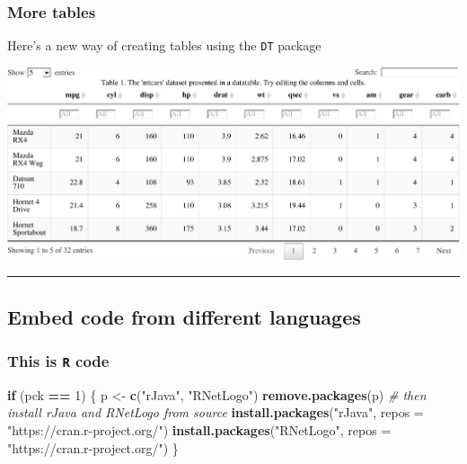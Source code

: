 \documentclass[portrait]{article}
\newenvironment{Shaded}{\begin{snugshade}}{\end{snugshade}}
\newcommand{\KeywordTok}[1]{\textcolor[rgb]{0.13,0.29,0.53}{\textbf{#1}}}
\newcommand{\DataTypeTok}[1]{\textcolor[rgb]{0.13,0.29,0.53}{#1}}
\newcommand{\DecValTok}[1]{\textcolor[rgb]{0.00,0.00,0.81}{#1}}
\newcommand{\StringTok}[1]{\textcolor[rgb]{0.31,0.60,0.02}{#1}}
\newcommand{\CommentTok}[1]{\textcolor[rgb]{0.56,0.35,0.01}{\textit{#1}}}
\newcommand{\ControlFlowTok}[1]{\textcolor[rgb]{0.13,0.29,0.53}{\textbf{#1}}}
\newcommand{\OperatorTok}[1]{\textcolor[rgb]{0.81,0.36,0.00}{\textbf{#1}}}
\newcommand{\NormalTok}[1]{#1}
\begin{document}
\subsubsection{More tables}\label{more-tables}

Here's a new way of creating tables using the \texttt{DT} package

\includegraphics{Lesson5_rmd_files/figure-latex/unnamed-chunk-4-1.pdf}

\begin{center}\rule{0.5\linewidth}{\linethickness}\end{center}

\subsection{Embed code from different
languages}\label{embed-code-from-different-languages}

\subsubsection{\texorpdfstring{This is \texttt{R}
code}{This is R code}}\label{this-is-r-code}

\begin{Shaded}
\begin{Highlighting}[]
\ControlFlowTok{if}\NormalTok{ (pck }\OperatorTok{==}\StringTok{ }\DecValTok{1}\NormalTok{) \{}
\NormalTok{    p <-}\StringTok{ }\KeywordTok{c}\NormalTok{(}\StringTok{"rJava"}\NormalTok{, }\StringTok{"RNetLogo"}\NormalTok{)}
    \KeywordTok{remove.packages}\NormalTok{(p)}
    \CommentTok{# then install rJava and RNetLogo from source}
    \KeywordTok{install.packages}\NormalTok{(}\StringTok{"rJava"}\NormalTok{, }\DataTypeTok{repos =} \StringTok{"https://cran.r-project.org/"}\NormalTok{)}
    \KeywordTok{install.packages}\NormalTok{(}\StringTok{"RNetLogo"}\NormalTok{, }\DataTypeTok{repos =} \StringTok{"https://cran.r-project.org/"}\NormalTok{)}
\NormalTok{\}}
\end{Highlighting}
\end{Shaded}
\end{document}
